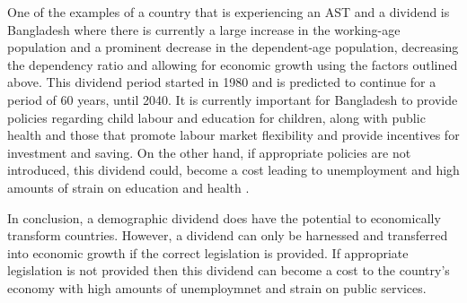 \documentclass[11pt]{article}
\begin{document}
One of the examples of a country that is experiencing an AST and a dividend is Bangladesh where there is currently a large increase in the working-age population and a prominent decrease in the dependent-age population, decreasing the dependency ratio and allowing for economic growth using the factors outlined above. This dividend period started in 1980 and is predicted to continue for a period of 60 years, until 2040. It is currently important for Bangladesh to provide policies regarding child labour and education for children, along with public health and those that promote labour market flexibility and provide incentives for investment and saving. On the other hand, if appropriate policies are not introduced, this dividend could, become a cost leading to unemployment and high amounts of strain on education and health \cite{matin2012}.

In conclusion, a demographic dividend does have the potential to economically transform countries. However, a dividend can only be harnessed and transferred into economic growth if the correct legislation is provided. If appropriate legislation is not provided then this dividend can become a cost to the country's economy with high amounts of unemploymnet and strain on public services.



\end{document}
